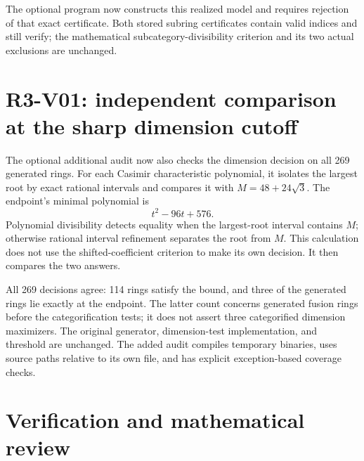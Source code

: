 \documentclass[11pt,a4paper]{article}
\begin{document}
The optional program 
now constructs this realized model and requires rejection of that
exact certificate. Both stored subring certificates contain valid
indices and still verify; the mathematical subcategory-divisibility
criterion and its two actual exclusions are unchanged.

\section{R3-V01: independent comparison at the sharp dimension cutoff}

The optional additional audit now also checks the dimension decision
on all 269 generated rings. For each Casimir characteristic polynomial,
it isolates the largest root by exact rational intervals and compares
it with $M=48+24\sqrt3$. The endpoint's minimal polynomial is
\[
                         t^2-96t+576.
\]
Polynomial divisibility detects equality when the largest-root
interval contains $M$; otherwise rational interval refinement
separates the root from $M$. This calculation does not use the
shifted-coefficient criterion to make its own decision. It then
compares the two answers.

All 269 decisions agree: 114 rings satisfy the bound, and three of
the generated rings lie exactly at the endpoint. The latter count
concerns generated fusion rings before the categorification tests;
it does not assert three categorified dimension maximizers.
The original generator, dimension-test implementation, and threshold
are unchanged. The added audit compiles temporary binaries, uses
source paths relative to its own file, and has explicit
exception-based coverage checks.

\section{Verification and mathematical review}
\end{document}
